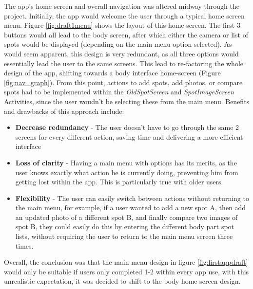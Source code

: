 The app's home screen and overall navigation was altered midway through the project. Initially, the app would welcome the user through a typical home screen menu. Figure \ref{fig:draft1menu} shows the layout of this home screen. The first 3 buttons would all lead to the body screen, after which either the camera or list of spots would be displayed (depending on the main menu option selected). As would seem apparent, this design is very redundant, as all three options would essentially lead the user to the same screens. This lead to re-factoring the whole design of the app, shifting towards a body interface home-screen (Figure \ref{fig:nav_graph}). From this point, actions to add spots, add photos, or compare spots had to be implemented within the \emph{OldSpotScreen} and \emph{SpotImageScreen} Activities, since the user woudn't be selecting these from the main menu. Benefits and drawbacks of this approach include:
\begin{itemize}
    \item \textbf{Decrease redundancy} - The user doesn't have to go through the same 2 screens for every different action, saving time and delivering a more efficient interface 
    \item \textbf{Loss of clarity} - Having a main menu with options has its merits, as the user knows exactly what action he is currently doing, preventing him from getting lost within the app. This is particularly true with older users.
    \item \textbf{Flexibility} - The user can easily switch between actions without returning to the main menu, for example, if a user wanted to add a new spot A, then  add an updated photo of a different spot B, and finally compare two images of spot B, they could easily do this by entering the different body part spot lists, without requiring the user to return to the main menu screen three times.
\end{itemize}
Overall, the conclusion was that the main menu design in figure \ref{fig:firstappdraft} would only be suitable if users only completed 1-2 within every app use, with this unrealistic expectation, it was decided to shift to the body home screen design.
\clearpage
